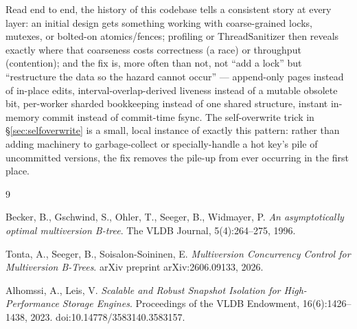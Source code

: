 \documentclass[11pt]{article}
\begin{document}
Read end to end, the history of this codebase tells a consistent story at every layer:
an initial design gets something working with coarse-grained locks, mutexes, or bolted-on
atomics/fences; profiling or ThreadSanitizer then reveals exactly where that coarseness
costs correctness (a race) or throughput (contention); and the fix is, more often than
not, not ``add a lock'' but ``restructure the data so the hazard cannot occur'' ---
append-only pages instead of in-place edits, interval-overlap-derived liveness instead of
a mutable obsolete bit, per-worker sharded bookkeeping instead of one shared structure,
instant in-memory commit instead of commit-time fsync. The self-overwrite trick in
\S\ref{sec:selfoverwrite} is a small, local instance of exactly this pattern: rather than
adding machinery to garbage-collect or specially-handle a hot key's pile of uncommitted
versions, the fix removes the pile-up from ever occurring in the first place.

\begin{thebibliography}{9}

Becker, B., Gschwind, S., Ohler, T., Seeger, B., Widmayer, P.
\emph{An asymptotically optimal multiversion B-tree}.
The VLDB Journal, 5(4):264--275, 1996.

Tonta, A., Seeger, B., Soisalon-Soininen, E.
\emph{Multiversion Concurrency Control for Multiversion B-Trees}.
arXiv preprint arXiv:2606.09133, 2026.

Alhomssi, A., Leis, V.
\emph{Scalable and Robust Snapshot Isolation for High-Performance Storage Engines}.
Proceedings of the VLDB Endowment, 16(6):1426--1438, 2023.
doi:10.14778/3583140.3583157.

\end{thebibliography}
\end{document}
